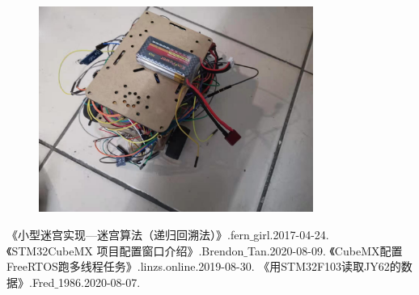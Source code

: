 \documentclass[UTF8]{ctexart}
\begin{document}
\begin{figure}[H]
\centering
\includegraphics[width=0.8\textwidth]{4.jpg}
\end{figure}
\begin{thebibliography}{123456} 
《小型迷宫实现---迷宫算法（递归回溯法）》.fern$\_$girl.2017-04-24.
《STM32CubeMX 项目配置窗口介绍》.Brendon$\_$Tan.2020-08-09.
《CubeMX配置FreeRTOS跑多线程任务》.linzs.online.2019-08-30.
《用STM32F103读取JY62的数据》.Fred$\_$1986.2020-08-07.
\end{thebibliography}
\end{document}
